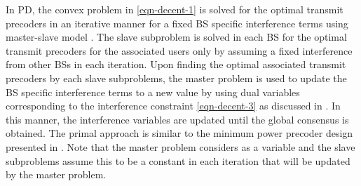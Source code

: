 
In \acl{PD}, the convex problem in \eqref{eqn-decent-1} is solved for the optimal transmit precoders in an iterative manner for a fixed \ac{BS} specific interference terms  using master-slave model \cite{pennanen2011decentralized}. The slave subproblem is solved in each \ac{BS} for the optimal transmit precoders for the associated users only by assuming a fixed interference  from other \acp{BS}  in each iteration. Upon finding the optimal associated transmit precoders by each slave subproblems, the master problem is used to update the \ac{BS} specific interference terms  to a new value by using dual variables corresponding to the interference constraint \eqref{eqn-decent-3} as discussed in \cite{pennanen2011decentralized}. In this manner, the interference variables are updated until the global consensus is obtained. The primal approach is similar to the minimum power precoder design presented in \cite{pennanen2011decentralized}. Note that the master problem considers  as a variable and the slave subproblems assume this to be a constant in each iteration that will be updated by the master problem.

\begin{comment}
The \acl{PD} approach decomposes the problem by fixing the interference variables \me{\zeta_{l,k,n,b} \forall k,b} in order to perform the precoder design independently across each \ac{BS}. Once the optimal precoders are designed at each \ac{BS} with the fixed interference constraints \eqref{eqn-decent-3}, the dual variables corresponding to the interference constraints are exchanged between the cooperating \acp{BS} in \me{\mc{B}} to update the interference variables \me{\zeta_{l,k,n,b}} for the next iteration until convergence. The primal approach is discussed extensively for the min-power problem in \cite{pennanen2011decentralized} and much of the current work follows similar approach. 

\subsubsection*{Convergence}
The convergence of the primal decomposition is similar to that of the centralized problem if the interference variables \me{\zeta_{l,k,n,b}} are allowed to converge to a stationary point. In practice, we can limit the number of exchanges to \me{J_{\max}} after which the \ac{SCA} update is performed until convergence or for \me{I_{\max}} times. The update of \me{\tilde{p}_{l,k,n}, \tilde{q}_{l,k,n}} and \me{\tilde{\beta}_{l,k,n}} can be made in conjunction with the receiver update \me{\mvec{W}{k,n}}. The receiver update can be made by using the precoded pilot transmission from each user as in \cite{komulainen2013effective}. 
\end{comment}